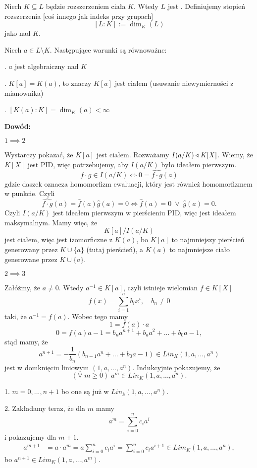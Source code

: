 Niech $K\subseteq L$ będzie rozszerzeniem ciała $K$. Wtedy $L$ jest . Definiujemy stopień rozszerzenia [coś innego jak indeks przy grupach]
$$[L:K]:=\dim_K(L)$$
jako  nad $K$.

\begin{uwaga}
    Niech $a\in L\setminus K$. Następujące warunki są równoważne:

. $a$ jest algebraiczny nad $K$

. $K[a]=K(a)$, to znaczy $K[a]$ jest ciałem (usuwanie niewymierności z mianownika)

. $[K(a):K]=\dim_K(a)<\infty$
\end{uwaga}

\textbf{Dowód:}

$1\implies2$

Wystarczy pokazać, że $K[a]$ jest ciałem. Rozważamy $I(a/K)\triangleleft K[X]$. Wiemy, że $K[X]$ jest PID, więc potrzebujemy, aby $I(a/K)$ było ideałem pierwszym.
$$f\cdot g\in I(a/K)\iff0=\hat{f\cdot g}(a)$$
gdzie daszek oznacza homomorfizm ewaluacji, który jest również homomorfizmem w punkcie. Czyli
$$\hat{f\cdot g}(a)=\hat{f}(a)\hat{g}(a)=0\iff\hat{f}(a)=0\;\lor\;\hat{g}(a)=0.$$
Czyli $I(a/K)$ jest ideałem pierwszym w pierścieniu PID, więc jest ideałem maksymalnym. Mamy więc, że
$$K[a]/I(a/K)$$
jest ciałem, więc jest izomorficzne z $K(a)$, bo $K[a]$ to najmniejszy pierścień generowany przez $K\cup\{a\}$ (tutaj pierścień), a $K(a)$ to najmniejsze ciało generowane przez $K\cup\{a\}$.

$2\implies 3$

Załóżmy, że $a\neq 0$. Wtedy $a^{-1}\in K[a]$, czyli istnieje wielomian $f\in K[X]$
$$f(x)=\sum\limits_{i=1}^n b_ix^i,\quad b_n\neq 0$$
taki, że $a^{-1}=f(a)$. Wobec tego mamy
$$1=f(a)\cdot a$$
$$0=f(a)a-1=b_na^{n+1}+b_aa^2+...+b_0a-1,$$
stąd mamy, że
$$a^{n+1}=-\frac1{b_n}(b_{n-1}a^n+...+b_0a-1)\in Lin_K(1, a, ..., a^n)$$
jest w domknięciu liniowym $(1, a,..., a^n)$. Indukcyjnie pokazujemy, że
$$(\forall\;m\geq0)\;a^m\in Lin_K(1,a,...,a^n).$$

1. $m=0,...,n+1$ bo one są już w $Lin_k(1,a,...,a^n)$.

2. Zakładamy teraz, że dla $m$ mamy 
$$a^m=\sum\limits_{i=0}^nc_ia^i$$ 
i pokazujemy dla $m+1$.
\begin{align*}
    a^{m+1}&=a\cdot a^m=a\sum\limits_{i=0}^nc_ia^{i}=\sum\limits_{i=0}^nc_ia^{i+1}\in Lim_K(1,a,...,a^n),
\end{align*}
bo $a^{n+1}\in Lim_K(1,a,...,a^m)$.

